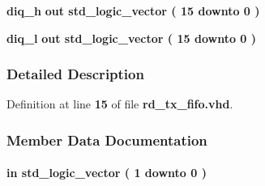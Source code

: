 \begin{DoxyCompactItemize}
{\bf diq\+\_\+h}  {\bfseries {\bfseries \textcolor{keywordflow}{out}\textcolor{vhdlchar}{ }}} {\bfseries \textcolor{comment}{std\+\_\+logic\+\_\+vector}\textcolor{vhdlchar}{ }\textcolor{vhdlchar}{(}\textcolor{vhdlchar}{ }\textcolor{vhdlchar}{ } \textcolor{vhdldigit}{15} \textcolor{vhdlchar}{ }\textcolor{keywordflow}{downto}\textcolor{vhdlchar}{ }\textcolor{vhdlchar}{ } \textcolor{vhdldigit}{0} \textcolor{vhdlchar}{ }\textcolor{vhdlchar}{)}\textcolor{vhdlchar}{ }} 
\item 
{\bf diq\+\_\+l}  {\bfseries {\bfseries \textcolor{keywordflow}{out}\textcolor{vhdlchar}{ }}} {\bfseries \textcolor{comment}{std\+\_\+logic\+\_\+vector}\textcolor{vhdlchar}{ }\textcolor{vhdlchar}{(}\textcolor{vhdlchar}{ }\textcolor{vhdlchar}{ } \textcolor{vhdldigit}{15} \textcolor{vhdlchar}{ }\textcolor{keywordflow}{downto}\textcolor{vhdlchar}{ }\textcolor{vhdlchar}{ } \textcolor{vhdldigit}{0} \textcolor{vhdlchar}{ }\textcolor{vhdlchar}{)}\textcolor{vhdlchar}{ }} 
\end{DoxyCompactItemize}


\subsubsection{Detailed Description}


Definition at line {\bf 15} of file {\bf rd\+\_\+tx\+\_\+fifo.\+vhd}.



\subsubsection{Member Data Documentation}
\paragraph[{ch\+\_\+en}]{ {\bfseries \textcolor{keywordflow}{in}\textcolor{vhdlchar}{ }} {\bfseries \textcolor{comment}{std\+\_\+logic\+\_\+vector}\textcolor{vhdlchar}{ }\textcolor{vhdlchar}{(}\textcolor{vhdlchar}{ }\textcolor{vhdlchar}{ } \textcolor{vhdldigit}{1} \textcolor{vhdlchar}{ }\textcolor{keywordflow}{downto}\textcolor{vhdlchar}{ }\textcolor{vhdlchar}{ } \textcolor{vhdldigit}{0} \textcolor{vhdlchar}{ }\textcolor{vhdlchar}{)}\textcolor{vhdlchar}{ }} \hspace{0.3cm}{\ttfamily [Port]}}\label{classrd__tx__fifo_a6494f316f504075c4ccf47146756d576}


